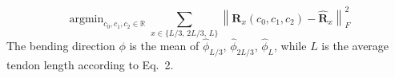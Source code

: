 \begin{equation}
\mathop{\arg\min}_{c_0, c_1, c_2 \in \mathbb{R}} \sum_{x \in \{L/3,\, 2L/3,\, L\}} \left\| \mathbf{R}_x(c_0, c_1, c_2) - \hat{\mathbf{R}}_x \right\|_F^2
\end{equation}
The bending direction $\phi$ is the mean of $\hat{\phi}_{L/3}$, $\hat{\phi}_{2L/3}$, $\hat{\phi}_{L}$, while $L$ is the average tendon length according to Eq.~2.
